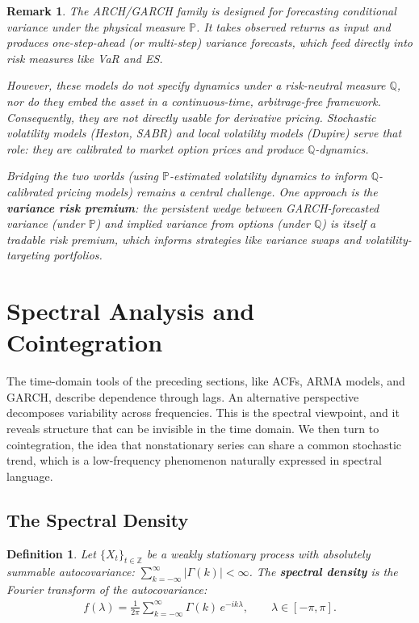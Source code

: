 \documentclass{report}
\theoremstyle{spacedplain}
\theoremstyle{spaceddefinition}
\newtheorem{definition}[theorem]{Definition}
\theoremstyle{spacedremark}
\newtheorem{remark}[theorem]{Remark}
\begin{document}
\begin{remark}
The ARCH/GARCH family is designed for forecasting conditional variance under the physical measure $\mathbb{P}$. It takes observed returns as input and produces one-step-ahead (or multi-step) variance forecasts, which feed directly into risk measures like VaR and ES.

However, these models do not specify dynamics under a risk-neutral measure $\mathbb{Q}$, nor do they embed the asset in a continuous-time, arbitrage-free framework. Consequently, they are not directly usable for derivative pricing. Stochastic volatility models (Heston, SABR) and local volatility models (Dupire) serve that role: they are calibrated to market option prices and produce $\mathbb{Q}$-dynamics.

Bridging the two worlds (using $\mathbb{P}$-estimated volatility dynamics to inform $\mathbb{Q}$-calibrated pricing models) remains a central challenge. One approach is the \textbf{variance risk premium}: the persistent wedge between GARCH-forecasted variance (under $\mathbb{P}$) and implied variance from options (under $\mathbb{Q}$) is itself a tradable risk premium, which informs strategies like variance swaps and volatility-targeting portfolios.
\end{remark}



\section{Spectral Analysis and Cointegration}

The time-domain tools of the preceding sections, like ACFs, ARMA models, and GARCH, describe dependence through lags. An alternative perspective decomposes variability across frequencies. This is the spectral viewpoint, and it reveals structure that can be invisible in the time domain. We then turn to cointegration, the idea that nonstationary series can share a common stochastic trend, which is a low-frequency phenomenon naturally expressed in spectral language.


\subsection{The Spectral Density}

\begin{definition}
Let $\{X_t\}_{t \in \mathbb{Z}}$ be a weakly stationary process with absolutely summable autocovariance: $\sum_{k=-\infty}^{\infty} |\Gamma(k)| < \infty$. The \textbf{spectral density} is the Fourier transform of the autocovariance:
\begin{align}
    f(\lambda) = \frac{1}{2\pi} \sum_{k=-\infty}^{\infty} \Gamma(k)\, e^{-ik\lambda}, \qquad \lambda \in [-\pi, \pi].
\end{align}
\end{definition}
\end{document}
